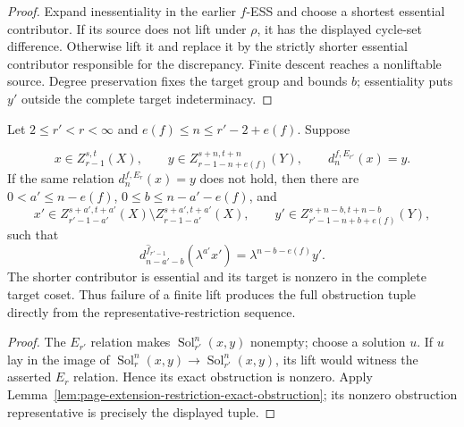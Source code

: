 \begin{proof}
  Expand inessentiality in the earlier $\widehat f$-ESS and choose a shortest
  essential contributor.  If its source does not lift under $\rho$, it has the
  displayed cycle-set difference.  Otherwise lift it and replace it by the
  strictly shorter essential contributor responsible for the discrepancy.
  Finite descent reaches a nonliftable source.  Degree preservation fixes the
  target group and bounds $b$; essentiality puts $y'$ outside the complete
  target indeterminacy.
\end{proof}

\begin{lemma}
  \label{lem:page-extension-first-obstruction}
  \notready
  Let $2\le r'<r<\infty$ and
  $e(f)\le n\le r'-2+e(f)$.  Suppose

  \[
    x\in Z_{r-1}^{s,t}(X),\qquad
    y\in Z_{r-1-n+e(f)}^{s+n,t+n}(Y),\qquad
    d_n^{f,E_{r'}}(x)=y.
  \]
  If the same relation $d_n^{f,E_r}(x)=y$ does not hold, then there are
  $0<a'\le n-e(f)$, $0\le b\le n-a'-e(f)$, and
  \[
    x'\in Z_{r'-1-a'}^{s+a',t+a'}(X)
       \setminus Z_{r-1-a'}^{s+a',t+a'}(X),
    \qquad
    y'\in Z_{r'-1-n+b+e(f)}^{s+n-b,t+n-b}(Y),
  \]
  such that
  \[
    d_{n-a'-b}^{\widehat f_{r'-1}}(\lambda^{a'}x')
       =\lambda^{n-b-e(f)}y'.
  \]
  The shorter contributor is essential and its target is nonzero in the
  complete target coset.  Thus failure of a finite lift produces the full
  obstruction tuple directly from the representative-restriction sequence.
\end{lemma}

\begin{proof}
  The $E_{r'}$ relation makes
  $\operatorname{Sol}_{r'}^n(x,y)$ nonempty; choose a solution $u$.  If $u$
  lay in the image of
  $\operatorname{Sol}_{r}^n(x,y)\to
  \operatorname{Sol}_{r'}^n(x,y)$, its lift would witness the asserted
  $E_r$ relation.  Hence its exact obstruction is nonzero.  Apply
  Lemma~\ref{lem:page-extension-restriction-exact-obstruction}; its nonzero
  obstruction representative is precisely the displayed tuple.
\end{proof}

